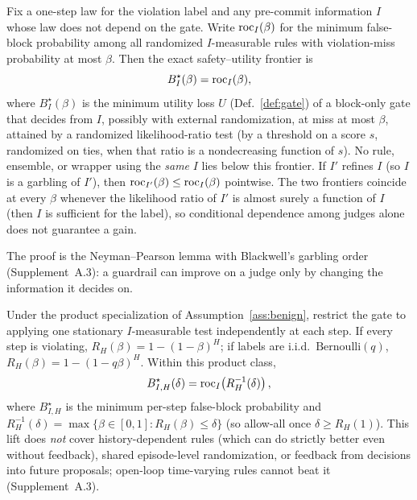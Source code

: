 \begin{proposition}\label{thm:frontier}
Fix a one-step law for the violation label and any pre-commit information $I$ whose
law does not depend on the gate. Write $\mathrm{roc}_I(\beta)$ for the minimum false-block
probability among all randomized $I$-measurable rules with violation-miss probability
at most $\beta$. Then the exact safety--utility frontier is
\[
  B_I^\star(\beta)=\mathrm{roc}_I(\beta),
\]
where $B_I^\star(\beta)$ is the minimum utility loss $U$ (Def.~\ref{def:gate}) of a
block-only gate that decides from $I$, possibly with external randomization, at miss at
most $\beta$,
attained by a randomized likelihood-ratio test (by a threshold on a score $s$,
randomized on ties, when that ratio is a nondecreasing function of $s$). No rule, ensemble, or wrapper using the \emph{same}
$I$ lies below this frontier. If $I'$ refines $I$ (so $I$ is a garbling of $I'$),
then $\mathrm{roc}_{I'}(\beta)\le\mathrm{roc}_I(\beta)$ pointwise. The two frontiers coincide at
every $\beta$ whenever the likelihood ratio of $I'$ is almost surely a function of $I$
(then $I$ is sufficient for the label), so conditional dependence among judges alone
does not guarantee a gain.
\end{proposition}

\noindent The proof is the Neyman--Pearson lemma \citep{neyman1933problem,tong2018np} with
Blackwell's garbling order \citep{blackwell1953equivalent} (Supplement~A.3): a guardrail can
improve on a judge only by changing the information it decides on.

\begin{corollary}\label{cor:reduction}
Under the product specialization of Assumption~\ref{ass:benign}, restrict the gate
to applying one stationary $I$-measurable test independently at each step. If every
step is violating, $R_H(\beta)=1-(1-\beta)^H$; if labels are i.i.d.\
$\mathrm{Bernoulli}(q)$, $R_H(\beta)=1-(1-q\beta)^H$. Within this product class,
\[
 B_{I,H}^\star(\delta)=\mathrm{roc}_I\!\left(R_H^{-1}(\delta)\right),
\]
where $B_{I,H}^\star$ is the minimum per-step false-block probability and
$R_H^{-1}(\delta)=\max\{\beta\in[0,1]:R_H(\beta)\le\delta\}$ (so allow-all once $\delta\ge R_H(1)$).
This lift does \emph{not} cover history-dependent rules (which can do
strictly better even without feedback), shared episode-level randomization, or
feedback from decisions into future proposals; open-loop time-varying rules cannot beat it
(Supplement~A.3).
\end{corollary}


